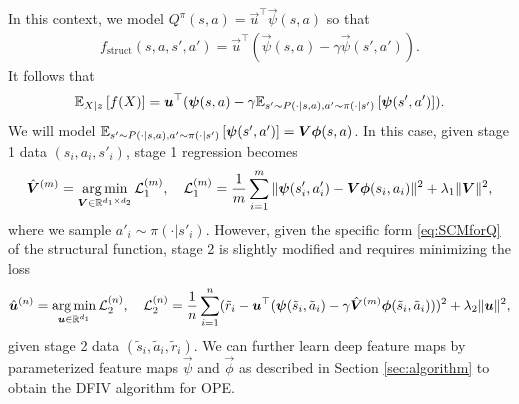 In this context, we model $Q^{\pi}(s,a)=\vec{u}^\top \vec{\psi}(s,a)$ so that
\begin{align}\label{eq:SCMforQ}
    f_\mathrm{struct}(s,a,s',a') = \vec{u}^\top (\vec{\psi}(s,a) - \gamma \vec{\psi}(s',a')).
\end{align}
It follows that 
\begin{align*}
\expect[X|z]{f(X)} = \vec{u}^\top(\vec{\psi}(s,a)- \gamma \expect[s'\sim P(\cdot|s,a), a'\sim \pi(\cdot | s')]{\vec{\psi}(s',a')}).
\end{align*}
We will model $\expect[s'\sim P(\cdot|s,a), a'\sim \pi(\cdot | s')]{\vec{\psi}(s',a')}=\vec{V} \vec{\phi}(s,a)$.
In this case, given stage 1 data $(s_i,a_i,s'_i)$, stage 1 regression becomes
\begin{align*}
    \hat{\vec{V}}^{(m)} = \argmin_{\vec{V} \in \mathbb{R}^{d_1 \times d_2}} \mathcal{L}_1^{(m)}, \quad \mathcal{L}_1^{(m)} = \frac1m \sum_{i=1}^m \|\vec{\psi}(s'_i,a'_i) - \vec{V}\vec{\phi}(s_i,a_i)\|^2 + \lambda_1 \|\vec{V}\|^2,
\end{align*}
where we sample $a'_i \sim \pi (\cdot|s'_i)$.
However, given the specific form \eqref{eq:SCMforQ} of the structural function, stage 2 is slightly modified and requires minimizing the loss
\begin{align*}
    \hat{\vec{u}}^{(n)} = \argmin_{\vec{u} \in \mathbb{R}^{d_1}}\mathcal{L}^{(n)}_2, \quad \mathcal{L}^{(n)}_2 = \frac1n \sum_{i=1}^n (\tilde r_i - \vec{u}^\top (\vec{\psi}(\tilde  s_i, \tilde a_i)-\gamma\hat{\vec{V}}^{(m)} \vec{\phi}(\tilde s_i, \tilde a_i)))^2 + \lambda_2 \|\vec{u}\|^2,
\end{align*}
given stage 2 data $(\tilde s_i, \tilde  a_i, \tilde r_i)$. We can further learn deep feature maps by parameterized feature maps $\vec{\psi}$ and $\vec{\phi}$ as described in Section \ref{sec:algorithm} to obtain the DFIV algorithm for OPE.